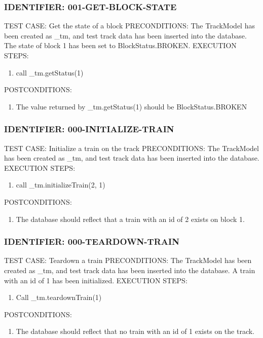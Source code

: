 \documentclass{scrreprt}
\begin{document}
\subsubsection{IDENTIFIER: 001-GET-BLOCK-STATE}
TEST CASE: Get the state of a block
PRECONDITIONS: The TrackModel has been created as _tm, and test track data has been inserted into the database. The state of block 1 has been set to BlockStatus.BROKEN.
EXECUTION STEPS:
\begin{enumerate}
	\item call _tm.getStatus(1)
\end{enumerate}
POSTCONDITIONS:
\begin{enumerate}
	\item The value returned by _tm.getStatus(1) should be BlockStatus.BROKEN
\end{enumerate}

\subsubsection{IDENTIFIER: 000-INITIALIZE-TRAIN}
TEST CASE: Initialize a train on the track
PRECONDITIONS: The TrackModel has been created as _tm, and test track data has been inserted into the database.
EXECUTION STEPS:
\begin{enumerate}
	\item call _tm.initializeTrain(2, 1)
\end{enumerate}
POSTCONDITIONS:
\begin{enumerate}
	\item The database should reflect that a train with an id of 2 exists on block 1.
\end{enumerate}

\subsubsection{IDENTIFIER: 000-TEARDOWN-TRAIN}
TEST CASE: Teardown a train
PRECONDITIONS: The TrackModel has been created as _tm, and test track data has been inserted into the database. A train with an id of 1 has been initialized.
EXECUTION STEPS:
\begin{enumerate}
	\item Call _tm.teardownTrain(1)
\end{enumerate}
POSTCONDITIONS:
\begin{enumerate}
	\item The database should reflect that no train with an id of 1 exists on the track.
\end{enumerate}
\end{document}
